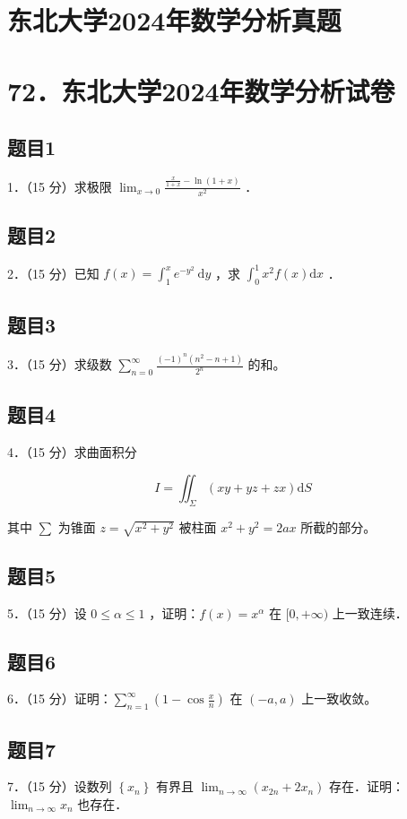 \documentclass{article}
\begin{document}
\section*{东北大学2024年数学分析真题}
\section*{72．东北大学2024年数学分析试卷}

\subsection{题目1}
1．（15 分）求极限 \(\lim _{x \rightarrow 0} \frac{\frac{x}{1+x}-\ln (1+x)}{x^{2}}\) ．

\subsection{题目2}
2．（15 分）已知 \(f(x)=\int_{1}^{x} e^{-y^{2}} \mathrm{~d} y\) ，求 \(\int_{0}^{1} x^{2} f(x) \mathrm{d} x\) ．

\subsection{题目3}
3．（15 分）求级数 \(\sum_{n=0}^{\infty} \frac{(-1)^{n}\left(n^{2}-n+1\right)}{2^{n}}\) 的和。

\subsection{题目4}
4．（15 分）求曲面积分

\[
I=\iint_{\Sigma}(x y+y z+z x) \mathrm{d} S
\]

其中 \(\sum\) 为锥面 \(z=\sqrt{x^{2}+y^{2}}\) 被柱面 \(x^{2}+y^{2}=2 a x\) 所截的部分。

\subsection{题目5}
5．（15 分）设 \(0 \leq \alpha \leq 1\) ，证明：\(f(x)=x^{\alpha}\) 在 \([0,+\infty)\) 上一致连续．

\subsection{题目6}
6．（15 分）证明：\(\sum_{n=1}^{\infty}\left(1-\cos \frac{x}{n}\right)\) 在 \((-a, a)\) 上一致收敛。

\subsection{题目7}
7．（15 分）设数列 \(\left\{x_{n}\right\}\) 有界且 \(\lim _{n \rightarrow \infty}\left(x_{2 n}+2 x_{n}\right)\) 存在．证明： \(\lim _{n \rightarrow \infty} x_{n}\) 也存在．
\end{document}
